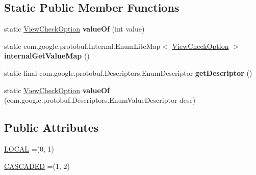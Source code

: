 \subsection*{Static Public Member Functions}
\begin{DoxyCompactItemize}
\item 
\mbox{\label{enumcom_1_1mysql_1_1cj_1_1x_1_1protobuf_1_1_mysqlx_crud_1_1_view_check_option_a4843af38e6406af927be67bc4345e996}} 
static \mbox{\hyperlink{enumcom_1_1mysql_1_1cj_1_1x_1_1protobuf_1_1_mysqlx_crud_1_1_view_check_option}{View\+Check\+Option}} {\bfseries value\+Of} (int value)
\item 
\mbox{\label{enumcom_1_1mysql_1_1cj_1_1x_1_1protobuf_1_1_mysqlx_crud_1_1_view_check_option_a8fad5bdbfaad079ad53ecb8549ce9666}} 
static com.\+google.\+protobuf.\+Internal.\+Enum\+Lite\+Map$<$ \mbox{\hyperlink{enumcom_1_1mysql_1_1cj_1_1x_1_1protobuf_1_1_mysqlx_crud_1_1_view_check_option}{View\+Check\+Option}} $>$ {\bfseries internal\+Get\+Value\+Map} ()
\item 
\mbox{\label{enumcom_1_1mysql_1_1cj_1_1x_1_1protobuf_1_1_mysqlx_crud_1_1_view_check_option_a79a1add53f92d0a8d9c0bf789a15a262}} 
static final com.\+google.\+protobuf.\+Descriptors.\+Enum\+Descriptor {\bfseries get\+Descriptor} ()
\item 
\mbox{\label{enumcom_1_1mysql_1_1cj_1_1x_1_1protobuf_1_1_mysqlx_crud_1_1_view_check_option_aec58c4f1de4f1165269f5bb228adb9ed}} 
static \mbox{\hyperlink{enumcom_1_1mysql_1_1cj_1_1x_1_1protobuf_1_1_mysqlx_crud_1_1_view_check_option}{View\+Check\+Option}} {\bfseries value\+Of} (com.\+google.\+protobuf.\+Descriptors.\+Enum\+Value\+Descriptor desc)
\end{DoxyCompactItemize}
\subsection*{Public Attributes}
\begin{DoxyCompactItemize}
\item 
\mbox{\hyperlink{enumcom_1_1mysql_1_1cj_1_1x_1_1protobuf_1_1_mysqlx_crud_1_1_view_check_option_ab18e917ff8495f0337bbbf5c6dc07383}{L\+O\+C\+AL}} =(0, 1)
\item 
\mbox{\hyperlink{enumcom_1_1mysql_1_1cj_1_1x_1_1protobuf_1_1_mysqlx_crud_1_1_view_check_option_a34e569a3da32cc1a6746e3ab862dcc1c}{C\+A\+S\+C\+A\+D\+ED}} =(1, 2)
\end{DoxyCompactItemize}
